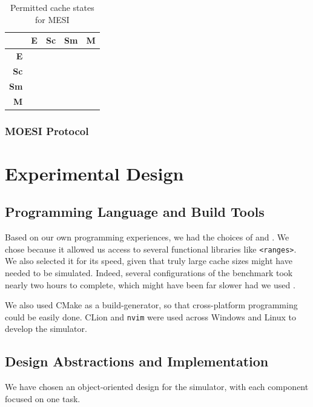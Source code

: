 \documentclass[date,tikzlibs,lmodern,10pt]{epreport}
\newcommand{\cmark}{\ding{51}}%
\newcommand{\xmark}{\ding{55}}%
\begin{document}
\begin{table}[htbp]
	\centering\begin{tabular}{r|cccc}
		            & \textbf{E}                  & \textbf{Sc}                 & \textbf{Sm}                 & \textbf{M}                  \\ \hline
		\textbf{E}  & \textcolor{red}{\xmark{}}   & \textcolor{red}{\xmark{}}   & \textcolor{red}{\xmark{}}   & \textcolor{green}{\xmark{}} \\
		\textbf{Sc} & \textcolor{red}{\xmark{}}   & \textcolor{red}{\cmark{}}   & \textcolor{red}{\cmark{}}   & \textcolor{green}{\xmark{}} \\
		\textbf{Sm} & \textcolor{red}{\xmark{}}   & \textcolor{red}{\cmark{}}   & \textcolor{green}{\xmark{}} & \textcolor{green}{\xmark{}} \\
		\textbf{M}  & \textcolor{green}{\xmark{}} & \textcolor{green}{\xmark{}} & \textcolor{green}{\xmark{}} & \textcolor{green}{\xmark{}}
	\end{tabular}
	\caption{Permitted cache states for MESI}
	\label{tab:dragon-table}
\end{table}

\subsubsection{MOESI Protocol}

\section{Experimental Design}
\subsection{Programming Language and Build Tools}
Based on our own programming experiences, we had the choices of \Cpp{} and \Cs{}. We chose  because it allowed us access to several functional libraries like \texttt{<ranges>}.
We also selected it for its speed, given that truly large cache sizes might have needed to be simulated.
Indeed, several configurations of the benchmark took nearly two hours to complete, which might have been far slower had we used \Cs{}.

We also used CMake as a build-generator, so that cross-platform programming could be easily done.
CLion and \texttt{nvim} were used across Windows and Linux to develop the simulator.

\subsection{Design Abstractions and Implementation}
We have chosen an object-oriented design for the simulator, with each component focused on one task.
\end{document}
